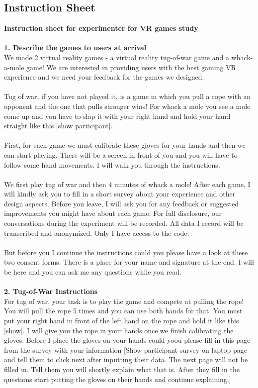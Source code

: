 \subsection{Instruction Sheet}
\label{subsection:instructionSheet}
\textbf{Instruction sheet for experimenter for VR games study}\\
\\
\textbf{1. Describe the games to users at arrival}\\
We made 2 virtual reality games - a virtual reality tug-of-war game and a whack-a-mole game!
We are interested in providing users with the best gaming VR experience and we need your feedback for the games we designed.\\
\\
Tug of war, if you have not played it, is a game in which you pull a rope with an opponent and the one that pulls stronger wins! For whack a mole you see a mole come up and you have to slap it with your right hand and hold your hand straight like this [show participant].\\
\\
First, for each game we must calibrate these gloves for your hands and then we can start playing. There will be a screen in front of you and you will have to follow some hand movements. I will walk you through the instructions. \\
\\
We first play tug of war and then 4 minutes of whack a mole! After each game, I will kindly ask you to fill in a short survey about your experience and other design aspects. Before you leave, I will ask you for any feedback or suggested improvements you might have about each game. For full disclosure, our conversations during the experiment will be recorded. All data I record will be transcribed and anonymized. Only I have access to the code.\\
\\
But before you I continue the instructions could you please have a look at these two consent forms. There is a place for your name and signature at the end. I will be here and you can ask me any questions while you read. \\
\\
\textbf{2. Tug-of-War Instructions} \\
For tug of war, your task is to play the game and compete at pulling the rope! You will pull the rope 5 times and you can use both hands for that. You must put your right hand in front of the left hand on the rope and hold it like this [show]. I will give you the rope in your hands once we finish calibrating the gloves. Before I place the gloves on your hands could yoou please fill in this page from the survey with your information [Show participant survey on laptop page and tell them to click next after inputting their data. The next page will not be filled in. Tell them you will shortly explain what that is. After they fill in the questions start putting the gloves on their hands and continue explaining.]\\
